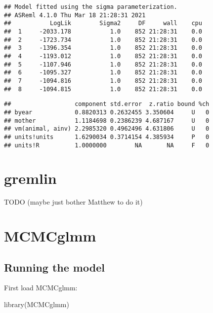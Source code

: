 \documentclass[
  12pt,
]{book}
\newenvironment{Shaded}{\begin{snugshade}}{\end{snugshade}}
\newcommand{\FunctionTok}[1]{\textcolor[rgb]{0.00,0.00,0.00}{#1}}
\newcommand{\NormalTok}[1]{#1}
\newcommand{\SpecialCharTok}[1]{\textcolor[rgb]{0.00,0.00,0.00}{#1}}
\begin{document}
\begin{verbatim}
## Model fitted using the sigma parameterization.
## ASReml 4.1.0 Thu Mar 18 21:28:31 2021
##           LogLik        Sigma2     DF     wall    cpu
##  1     -2033.178           1.0    852 21:28:31    0.0
##  2     -1723.734           1.0    852 21:28:31    0.0
##  3     -1396.354           1.0    852 21:28:31    0.0
##  4     -1193.012           1.0    852 21:28:31    0.0
##  5     -1107.946           1.0    852 21:28:31    0.0
##  6     -1095.327           1.0    852 21:28:31    0.0
##  7     -1094.816           1.0    852 21:28:31    0.0
##  8     -1094.815           1.0    852 21:28:31    0.0
\end{verbatim}

\begin{Shaded}
\end{Shaded}

\begin{verbatim}
##                  component std.error  z.ratio bound %ch
## byear            0.8820313 0.2632455 3.350604     U   0
## mother           1.1184698 0.2386239 4.687167     U   0
## vm(animal, ainv) 2.2985320 0.4962496 4.631806     U   0
## units!units      1.6290034 0.3714154 4.385934     P   0
## units!R          1.0000000        NA       NA     F   0
\end{verbatim}

\hypertarget{gremlin-1}{%
\section{gremlin}\label{gremlin-1}}

TODO (maybe just bother Matthew to do it)

\hypertarget{mcmcglmm-1}{%
\section{MCMCglmm}\label{mcmcglmm-1}}

\hypertarget{running-the-model-1}{%
\subsection{Running the model}\label{running-the-model-1}}

First load MCMCglmm:

\begin{Shaded}
\begin{Highlighting}[]
\FunctionTok{library}\NormalTok{(MCMCglmm)}
\end{Highlighting}
\end{Shaded}
\end{document}
